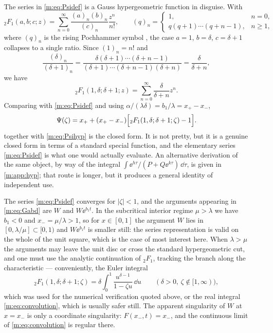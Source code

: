 The series in \cref{m:eq:Psidef} is a Gauss hypergeometric function in
disguise. With
\begin{equation}
\label{m:eq:2F1def}
{}_2F_1(a,b;c;z) = \sum_{n=0}^{\infty}\frac{(a)_n(b)_n}{(c)_n}\frac{z^n}{n!},
\qquad
(q)_n = \begin{cases}1, & n=0,\\ q(q+1)\cdots(q+n-1), & n\ge1,\end{cases}
\end{equation}
where $(q)_n$ is the rising Pochhammer symbol \cite{Olver2010}, the case
$a=1$, $b=\delta$, $c=\delta+1$ collapses to a single ratio. Since $(1)_n=n!$
and
\begin{equation}
\label{m:eq:pochcancel}
\frac{(\delta)_n}{(\delta+1)_n}
= \frac{\delta(\delta+1)\cdots(\delta+n-1)}{(\delta+1)\cdots(\delta+n-1)(\delta+n)}
= \frac{\delta}{\delta+n},
\end{equation}
we have
\begin{equation}
\label{m:eq:2F1simple}
{}_2F_1(1,\delta;\delta+1;z) = \sum_{n=0}^{\infty}\frac{\delta}{\delta+n}z^n .
\end{equation}
Comparing with \cref{m:eq:Psidef} and using
$\alpha/(\lambda\delta) = b_1/\lambda = x_+-x_-$,
\begin{equation}
\label{m:eq:Psihyp}
\Psi(\zeta) = x_+ + (x_+-x_-)\Bigl[{}_2F_1(1,\delta;\delta+1;\zeta)-1\Bigr] .
\end{equation}
 together with \cref{m:eq:Psihyp} is the closed form. It is not
pretty, but it is a genuine closed form in terms of a standard special
function, and the elementary series \cref{m:eq:Psidef} is what one would
actually evaluate. An alternative derivation of the same object, by way of the
integral $\int\ee^{h\tau}/(P+Q\ee^{k\tau})\,\dd\tau$, is given in
\cref{m:app:hyp}; that route is longer, but it produces a general identity of
independent use.

\begin{remark}
\label{m:rem:domain}
The series \cref{m:eq:Psidef} converges for $|\zeta|<1$, and the arguments
appearing in \cref{m:eq:Gabd} are $W$ and $W\ee^{b_1t}$. In the subcritical
interior regime $\mu>\lambda$ we have $b_1<0$ and $x_- = \mu/\lambda>1$, so
for $x\in[0,1]$ the argument $W$ lies in $[0,\lambda/\mu]\subset[0,1)$ and
$W\ee^{b_1t}$ is smaller still: the series representation is valid on the whole
of the unit square, which is the case of most interest here. When $\lambda>\mu$
the arguments may leave the unit disc or cross the standard hypergeometric cut,
and one must use the analytic continuation of ${}_2F_1$, tracking the branch
along the characteristic --- conveniently, the Euler integral
\begin{equation*}
{}_2F_1(1,\delta;\delta+1;\zeta) = \delta\int_0^1\frac{u^{\delta-1}}{1-\zeta u}\,\dd u
\qquad(\delta>0,\ \zeta\notin[1,\infty)),
\end{equation*}
which was used for the numerical verification quoted above, or the real
integral \cref{m:eq:convolution}, which is usually safer still. The apparent
singularity of $W$ at $x=x_-$ is only a coordinate singularity:
$F(x_-,t)=x_-$, and the continuous limit of \cref{m:eq:convolution} is regular
there.
\end{remark}

